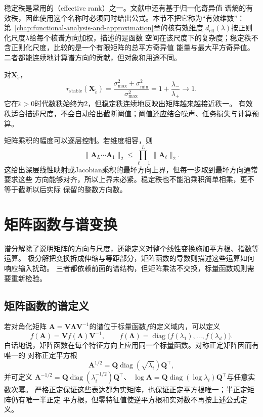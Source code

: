 稳定秩是常用的（effective rank）之一。文献中还有基于归一化奇异值
谱熵的有效秩，因此使用这个名称时必须同时给出公式。本节不把它称为“有效维数”：
第~\ref{chap:functional-analysis-and-approximation}章的核有效维度
$d_{\mathrm{eff}}(\lambda)$按正则化尺度$\lambda$给每个核谱方向加权，描述的是函数
空间在该尺度下的复杂度；稳定秩不含正则化尺度，比较的是一个有限矩阵的总平方奇异值
能量与最大平方奇异值。二者都能连续地计算谱方向的贡献，但对象和用途不同。

对$\bm{X}_{\widetilde{\varepsilon}}$，
\[
  r_{\mathrm{stable}}(\bm{X}_{\widetilde{\varepsilon}})
  =\frac{\sigma_{\max}^2+\sigma_{\min}^2}{\sigma_{\max}^2}
  =
  1+\frac{\lambda_-}{\lambda_+}
  \longrightarrow 1.
\]
它在$\widetilde{\varepsilon}>0$时代数秩始终为$2$，但稳定秩连续地反映出矩阵越来越接近秩一。
有效秩适合描述尺度，不会自动给出截断阈值；阈值还应结合噪声、任务损失与计算预算。

矩阵乘积的幅度可以逐层控制。若维度相容，则
\[
  \lVert\bm{A}_L\cdots\bm{A}_1\rVert_2
  \leq\prod_{\ell=1}^{L}\lVert\bm{A}_{\ell}\rVert_2.
\]
这给出深层线性映射或Jacobian乘积的最坏方向上界，但每一步取到最坏方向通常要求这些
方向能够对齐，所以上界未必紧。稳定秩也不能沿乘积简单相乘，更不等于截断以后实际
保留的整数方向数。

\section{矩阵函数与谱变换}
\label{sec:matrix-analysis-functions-structured-operations}

谱分解除了说明矩阵的方向与尺度，还能定义对整个线性变换施加平方根、指数等运算。
极分解把变换拆成伸缩与等距部分，矩阵函数的导数则描述这些运算如何响应输入扰动。
三者都依赖前面的谱结构，但矩阵乘法不交换，标量函数规则需要重新检验。

\subsection{矩阵函数的谱定义}

若对角化矩阵
$\bm{A}=\bm{V}\bm{\Lambda}\bm{V}^{-1}$的谱位于标量函数$f$的定义域内，可以定义
\begin{equation}
  f(\bm{A})=\bm{V}f(\bm{\Lambda})\bm{V}^{-1},
  \qquad
  f(\bm{\Lambda})=
  \operatorname{diag}\bigl(f(\lambda_1),\ldots,f(\lambda_d)\bigr).
  \label{eq:matrix-analysis-matrix-function-diagonalizable}
\end{equation}
白话地说，矩阵函数在每个特征方向上应用同一个标量函数。对称正定矩阵因而有唯一的
对称正定平方根
\[
  \bm{A}^{1/2}
  =\bm{Q}\operatorname{diag}(\sqrt{\lambda_i})\bm{Q}^{\top},
\]
并可定义
$\bm{A}^{-1/2}
=\bm{Q}\operatorname{diag}(\lambda_i^{-1/2})\bm{Q}^{\top}$、
$\log\bm{A}
=\bm{Q}\operatorname{diag}(\log\lambda_i)\bm{Q}^{\top}$与任意实数次幂。
严格正定保证这些表达都为实矩阵，也保证正定平方根唯一；半正定矩阵仍有唯一半正定
平方根，但零特征值使逆平方根和实对数不再按上述公式定义。

